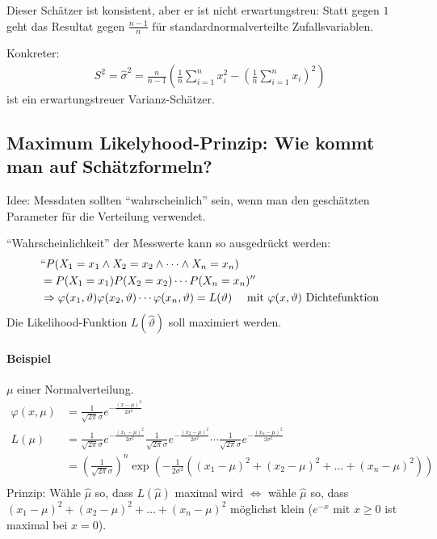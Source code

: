 \documentclass[10pt,a4paper]{scrartcl}
\newif\ifincludeExamples
\begin{document}
Dieser Schätzer ist konsistent, aber er ist nicht erwartungstreu: Statt gegen $1$ geht das Resultat gegen $\frac{n-1}{n}$ für standardnormalverteilte Zufallsvariablen.

Konkreter: 
\begin{align*}
  S^2 = \hat{\sigma}^2 = \frac{n}{n-1} \left(\frac{1}{n} \sum_{i=1}^n x_i^2 - \left(\frac{1}{n} \sum_{i=1}^n x_i\right)^2 \right)
\end{align*}
ist ein erwartungstreuer Varianz-Schätzer.

\subsection{Maximum Likelyhood-Prinzip: Wie kommt man auf Schätzformeln?}

Idee: Messdaten sollten ``wahrscheinlich'' sein, wenn man den geschätzten Parameter für die Verteilung verwendet.

``Wahrscheinlichkeit'' der Messwerte kann so ausgedrückt werden:
\begin{align*}
    &``P(X_1=x_1 \wedge X_2=x_2 \wedge \dots \wedge X_n=x_n) \\
    &= P(X_1=x_1)P(X_2=x_2)\cdots P(X_n=x_n)'' \\
    & \Rightarrow \varphi(x_1, \vartheta)\varphi(x_2, \vartheta)\cdots \varphi(x_n, \vartheta) = L(\vartheta) \quad \text{ mit } \varphi(x, \vartheta) \text{ Dichtefunktion}
\end{align*}
Die Likelihood-Funktion $L(\hat{\vartheta})$ soll maximiert werden.

\ifincludeExamples
\paragraph{Beispiel} $\mu$ einer Normalverteilung.
\begin{align*}
 \varphi(x, \mu) &= \frac{1}{\sqrt{2\pi}\sigma} e^{-\frac{(x-\mu)^2}{2\sigma^2}} \\
  L(\mu) &=  \frac{1}{\sqrt{2\pi}\sigma} e^{-\frac{(x_1-\mu)^2}{2\sigma^2}} 
              \frac{1}{\sqrt{2\pi}\sigma} e^{-\frac{(x_2-\mu)^2}{2\sigma^2}} \cdots 
              \frac{1}{\sqrt{2\pi}\sigma} e^{-\frac{(x_n-\mu)^2}{2\sigma^2}} \\
         &= \left(\frac{1}{\sqrt{2\pi}\sigma} \right)^n \exp\left(-\frac{1}{2\sigma^2} \left((x_1-\mu)^2 + 
           (x_2-\mu)^2 + \dots + (x_n-\mu)^2\right)\right)\\
\end{align*}
Prinzip: Wähle $\hat{\mu}$ so, dass $L(\hat{\mu})$ maximal wird $\Longleftrightarrow$ wähle $\hat{\mu}$ so, dass $(x_1-\mu)^2 + 
           (x_2-\mu)^2 + \dots + (x_n-\mu)^2$ möglichst klein ($e^{-x}$ mit $x\ge 0$ ist maximal bei $x=0$).
\end{document}
